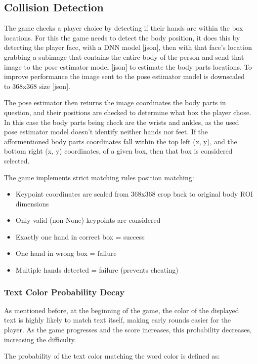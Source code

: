 \documentclass[12pt]{article}
\begin{document}
\subsection{Collision Detection}

The game checks a player choice by detecting if their hands are within the box
locations. For this the game needs to detect the body position, it does this by
detecting the player face, with a DNN model [json], then with that face's
location grabbing a subimage that contains the entire body of the person and
send that image to the pose estimator model [json] to estimate the body parts
locations. To improve performance the image sent to the pose estimator model is
downscaled to 368x368 size [json].

The pose estimator then returns the image coordinates the body parts in
question, and their positions are checked to determine what box the player
chose. In this case the body parts being check are the wrists and ankles, as
the used pose estimator model doesn't identify neither hands nor feet. If the
afformentioned body parts coordinates fall within the top left (x, y), and the
bottom right (x, y) coordinates, of a given box, then that box is considered
selected.

The game implements strict matching rules position matching:
\begin{itemize}
    \item Keypoint coordinates are scaled from 368x368 crop back to original body ROI
          dimensions
    \item Only valid (non-None) keypoints are considered
    \item Exactly one hand in correct box = success
    \item One hand in wrong box = failure
    \item Multiple hands detected = failure (prevents cheating)
\end{itemize}

\subsubsection{Text Color Probability Decay}

As mentioned before, at the beginning of the game, the color of the displayed
text is highly likely to match text itself, making early rounds easier for the
player. As the game progresses and the score increases, this probability
decreases, increasing the difficulty.

The probability of the text color matching the word color is defined as:
\end{document}
